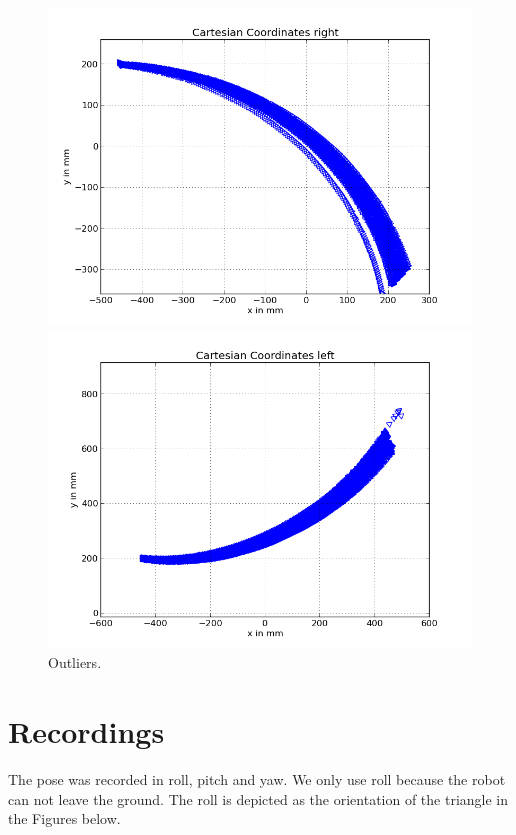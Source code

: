\documentclass{scrartcl}
\begin{document}
\begin{figure}[H]
\centering
\begin{minipage}{.5\textwidth}
  \centering
  \includegraphics[width=.8\linewidth]{img/right_outliers.png}
\end{minipage}%
\begin{minipage}{.5\textwidth}
  \centering
  \includegraphics[width=.8\linewidth]{img/left_outlier.png}
\end{minipage}
\caption{Outliers.}
\label{fig:outliers}
\end{figure}


\section{Recordings}
The pose was recorded in roll, pitch and yaw. We only use roll because the robot can not leave the ground. The roll is depicted as the orientation of the triangle in the Figures below.\\
\end{document}
